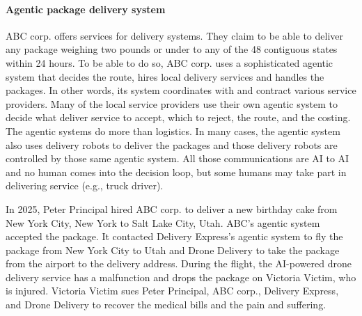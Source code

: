 \documentclass[11pt]{article}
\begin{document}
\paragraph{Agentic package delivery system} ABC corp. offers services for delivery systems.  They claim to be able to deliver any package weighing two pounds or under to any of the 48 contiguous states within 24 hours.  To be able to do so, ABC corp. uses a sophisticated agentic system that decides the route, hires local delivery services and handles the packages.  In other words, its system coordinates with and contract various service providers.  Many of the local service providers use their own agentic system to decide what deliver service to accept, which to reject, the route, and the costing.  The agentic systems do more than logistics.  In many cases, the agentic system also uses delivery robots to deliver the packages and those delivery robots are controlled by those same agentic system.  All those communications are AI to AI and no human comes into the decision loop, but some humans may take part in delivering service (e.g., truck driver).  

In 2025, Peter Principal hired ABC corp. to deliver a new birthday cake from New York City, New York to Salt Lake City, Utah.  ABC's agentic system accepted the package.  It contacted Delivery Express's agentic system to fly the package from New York City to Utah and Drone Delivery to take the package from the airport to the delivery address.  During the flight, the AI-powered drone delivery service has a malfunction and drops the package on Victoria Victim, who is injured.  Victoria Victim sues Peter Principal, ABC corp., Delivery Express, and Drone Delivery to recover the medical bills and the pain and suffering.
\end{document}
